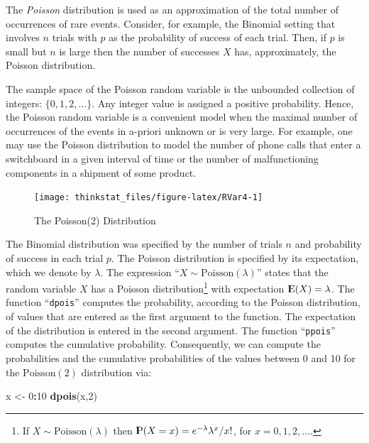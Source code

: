 \documentclass[]{krantz}
\makeatletter
\newenvironment{Shaded}{\begin{snugshade}}{\end{snugshade}}
\newcommand{\KeywordTok}[1]{\textcolor[rgb]{0.13,0.29,0.53}{\textbf{#1}}}
\newcommand{\DecValTok}[1]{\textcolor[rgb]{0.00,0.00,0.81}{#1}}
\newcommand{\StringTok}[1]{\textcolor[rgb]{0.31,0.60,0.02}{#1}}
\newcommand{\OperatorTok}[1]{\textcolor[rgb]{0.81,0.36,0.00}{\textbf{#1}}}
\newcommand{\NormalTok}[1]{#1}
\newcommand{\Expec}{{\rm I\kern-.3em E}}
\newcommand{\Prob}{{\rm I\kern-.3em P}}
\newenvironment{kframe}{%
\medskip{}
\setlength{\fboxsep}{.8em}
 \def\at@end@of@kframe{}%
 \ifinner\ifhmode%
  \def\at@end@of@kframe{\end{minipage}}%
  \begin{minipage}{\columnwidth}%
 \fi\fi%
 \def\FrameCommand##1{\hskip\@totalleftmargin \hskip-\fboxsep
 \colorbox{shadecolor}{##1}\hskip-\fboxsep
     \hskip-\linewidth \hskip-\@totalleftmargin \hskip\columnwidth}%
 \MakeFramed {\advance\hsize-\width
   \@totalleftmargin\z@ \linewidth\hsize
   \@setminipage}}%
 {\par\unskip\endMakeFramed%
 \at@end@of@kframe}
\renewenvironment{Shaded}{\begin{kframe}}{\end{kframe}}
\theoremstyle{definition}
\theoremstyle{definition}
\theoremstyle{definition}
\theoremstyle{remark}
\makeatother
\begin{document}
The \emph{Poisson} distribution is used as an approximation of the total
number of occurrences of rare events. Consider, for example, the
Binomial setting that involves \(n\) trials with \(p\) as the
probability of success of each trial. Then, if \(p\) is small but \(n\)
is large then the number of successes \(X\) has, approximately, the
Poisson distribution.

The sample space of the Poisson random variable is the unbounded
collection of integers: \(\{0,1,2, \ldots\}\). Any integer value is
assigned a positive probability. Hence, the Poisson random variable is a
convenient model when the maximal number of occurrences of the events in
a-priori unknown or is very large. For example, one may use the Poisson
distribution to model the number of phone calls that enter a switchboard
in a given interval of time or the number of malfunctioning components
in a shipment of some product.

\begin{figure}

{\centering \texttt{[image: thinkstat\_files/figure-latex/RVar4-1]} 

}

\caption{The Poisson(2) Distribution}\label{fig:RVar4}
\end{figure}

The Binomial distribution was specified by the number of trials \(n\)
and probability of success in each trial \(p\). The Poisson distribution
is specified by its expectation, which we denote by \(\lambda\). The
expression ``\(X \sim \mathrm{Poisson}(\lambda)\)'' states that the
random variable \(X\) has a Poisson distribution\footnote{If
  \(X \sim \mathrm{Poisson}(\lambda)\) then
  \(\Prob(X=x) = e^{-\lambda}\lambda^x/x!\), for \(x=0,1,2,\ldots\).}
with expectation \(\Expec(X) = \lambda\). The function
``\texttt{dpois}'' computes the probability, according to the Poisson
distribution, of values that are entered as the first argument to the
function. The expectation of the distribution is entered in the second
argument. The function ``\texttt{ppois}'' computes the cumulative
probability. Consequently, we can compute the probabilities and the
cumulative probabilities of the values between 0 and 10 for the
\(\mathrm{Poisson}(2)\) distribution via:

\begin{Shaded}
\begin{Highlighting}[]
\NormalTok{x <-}\StringTok{ }\DecValTok{0}\OperatorTok{:}\DecValTok{10}
\KeywordTok{dpois}\NormalTok{(x,}\DecValTok{2}\NormalTok{)}
\end{Highlighting}
\end{Shaded}
\end{document}
